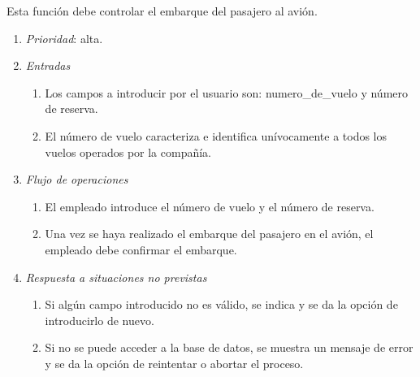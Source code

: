 
 \label{fun:efectuarembarque}
	Esta función debe controlar el embarque del pasajero al avión.

	\begin{enumerate}
		\item \textit{Prioridad}: alta.
		\item \textit{Entradas}
		\begin{enumerate}
			\item Los campos a introducir por el usuario son: \gls{numero_de_vuelo} y número de reserva.
			\item El número de vuelo caracteriza e identifica unívocamente a todos los vuelos operados por la compañía.
		\end{enumerate}
		\item \textit{Flujo de operaciones}
		\begin{enumerate}
			\item El empleado introduce el número de vuelo y el número de reserva.
			\item Una vez se haya realizado el embarque del pasajero en el avión, el empleado debe confirmar el embarque.
		\end{enumerate}
		\item \textit{Respuesta a situaciones no previstas}
		\begin{enumerate}
			\item Si algún campo introducido no es válido, se indica y se da la opción de introducirlo de nuevo.
			\item Si no se puede acceder a la base de datos, se muestra un mensaje de error y se da la opción de reintentar o abortar el proceso.
		\end{enumerate}
	\end{enumerate}
